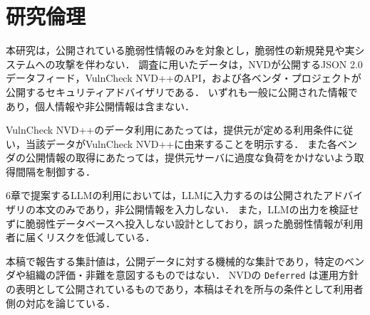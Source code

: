 \section{研究倫理}
\label{sec:ethics}

本研究は，公開されている脆弱性情報のみを対象とし，脆弱性の新規発見や実システムへの攻撃を伴わない．
調査に用いたデータは，NVDが公開するJSON 2.0データフィード，VulnCheck NVD++のAPI，および各ベンダ・プロジェクトが公開するセキュリティアドバイザリである．
いずれも一般に公開された情報であり，個人情報や非公開情報は含まない．

VulnCheck NVD++のデータ利用にあたっては，提供元が定める利用条件に従い，当該データがVulnCheck NVD++に由来することを明示する．
また各ベンダの公開情報の取得にあたっては，提供元サーバに過度な負荷をかけないよう取得間隔を制御する．

6章で提案するLLMの利用においては，LLMに入力するのは公開されたアドバイザリの本文のみであり，非公開情報を入力しない．
また，LLMの出力を検証せずに脆弱性データベースへ投入しない設計としており，誤った脆弱性情報が利用者に届くリスクを低減している．

本稿で報告する集計値は，公開データに対する機械的な集計であり，特定のベンダや組織の評価・非難を意図するものではない．
NVDの \texttt{Deferred} は運用方針の表明として公開されているものであり，本稿はそれを所与の条件として利用者側の対応を論じている．
